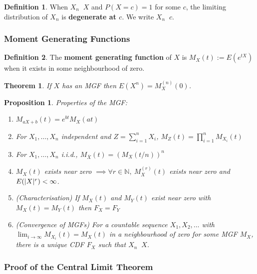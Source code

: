 \documentclass[12pt]{article}
\newtheorem{thm}{Theorem}[section]
\newtheorem*{prop*}{Proposition}
\theoremstyle{definition}
\newtheorem{defn}{Definition}[subsection]
\DeclarePairedDelimiter\abs{\lvert}{\rvert}
\newcommand{\N}{\mathbb{N}}
\DeclareMathOperator{\distto}{\xrightarrow{\mathcal{D}}}
\begin{document}
\begin{defn}
  When $X_n \distto X$ and $P(X = c) = 1$ for some $c$, the limiting distribution of $X_n$ is \textbf{degenerate at $c$}.
  We write $X_n \distto c$.
\end{defn}

\subsubsection{Moment Generating Functions}

\begin{defn}
  The \textbf{moment generating function} of $X$ is $M_X(t) := E(e^{tX})$ when it exists in some neighbourhood of zero.
\end{defn}


\begin{thm}
  If $X$ has an MGF then $E(X^n) = M_X^{(n)}(0)$.
\end{thm}


\begin{prop*}
  Properties of the MGF:
  \begin{enumerate}
    \item $M_{aX + b}(t) = e^{bt}M_X(at)$
    \item For $X_1, \ldots, X_n$ independent and $Z = \sum_{i = 1}^nX_i$, $M_Z(t) = \prod_{i = 1}^nM_{X_i}(t)$
    \item For $X_1, \ldots, X_n$ i.i.d., $M_{\overline{X}}(t) = (M_X(t / n))^n$
    \item $M_X(t)$ exists near zero $\implies \forall r \in \N,\ M_X^{(r)}(t)$ exists near zero and $E(\abs{X}^r) < \infty$.
    \item (Characterisation) If $M_X(t)$ and $M_Y(t)$ exist near zero with $M_X(t) = M_Y(t)$ then $F_X = F_Y$
    \item (Convergence of MGFs) For a countable sequence $X_1, X_2, \ldots$ with $\lim_{i \to \infty}M_{X_i}(t) = M_X(t)$ in a neighbourhood of zero for some MGF $M_X$, there is a unique CDF $F_X$ such that $X_n \distto X$. 
  \end{enumerate}
\end{prop*}

\subsubsection{Proof of the Central Limit Theorem}
\end{document}
